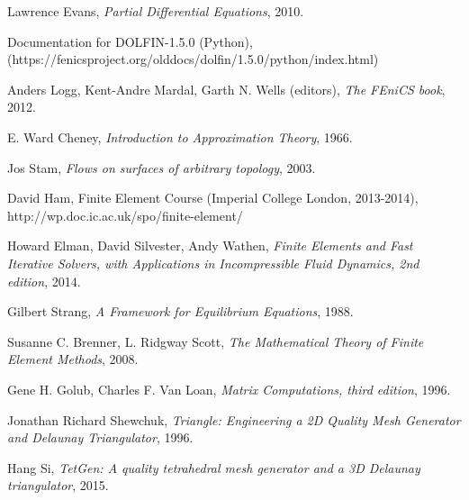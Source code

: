 \documentclass[11pt,a4paper]{memoir}
\begin{document}
\begin{thebibliography}{9}
Lawrence Evans,
\textit{Partial Differential Equations},
2010.

Documentation for DOLFIN-1.5.0 (Python),\\
(https://fenicsproject.org/olddocs/dolfin/1.5.0/python/index.html)

Anders Logg, Kent-Andre Mardal, Garth N. Wells (editors),
\textit{The FEniCS book},
2012.

E. Ward Cheney,
\textit{Introduction to Approximation Theory},
1966.

Jos Stam,
\textit{Flows on surfaces of arbitrary topology},
2003.

David Ham, Finite Element Course
(Imperial College London, 2013-2014),\\
http://wp.doc.ic.ac.uk/spo/finite-element/

Howard Elman, David Silvester, Andy Wathen,
\textit{Finite Elements and Fast Iterative Solvers, with Applications in Incompressible Fluid Dynamics, 2nd edition},
2014.

Gilbert Strang,
\textit{A Framework for Equilibrium Equations},
1988.

Susanne C. Brenner, L. Ridgway Scott,
\textit{The Mathematical Theory of Finite Element Methods},
2008.

Gene H. Golub, Charles F. Van Loan,
\textit{Matrix Computations, third edition},
1996.

Jonathan Richard Shewchuk,
\textit{Triangle: Engineering a 2D Quality Mesh Generator and Delaunay Triangulator},
1996.

Hang Si,
\textit{TetGen: A quality tetrahedral mesh generator and a 3D Delaunay triangulator},
2015.


\end{thebibliography}
\end{document}
